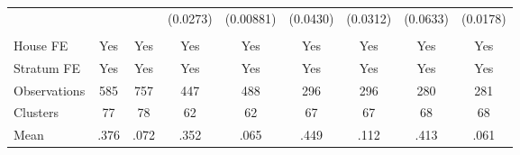 {\begin{tabular}{l*{8}{c}}
                &         &         & (0.0273)&(0.00881)& (0.0430)& (0.0312)& (0.0633)& (0.0178)\\
                &         &         &         &         &         &         &         &         \\
House FE        &      Yes&      Yes&      Yes&      Yes&      Yes&      Yes&      Yes&      Yes\\
Stratum FE      &      Yes&      Yes&      Yes&      Yes&      Yes&      Yes&      Yes&      Yes\\
\midrule
Observations    &      585&      757&      447&      488&      296&      296&      280&      281\\
Clusters        &       77&       78&       62&       62&       67&       67&       68&       68\\
Mean            &     .376&     .072&     .352&     .065&     .449&     .112&     .413&     .061\\
\bottomrule
\end{tabular}
}
